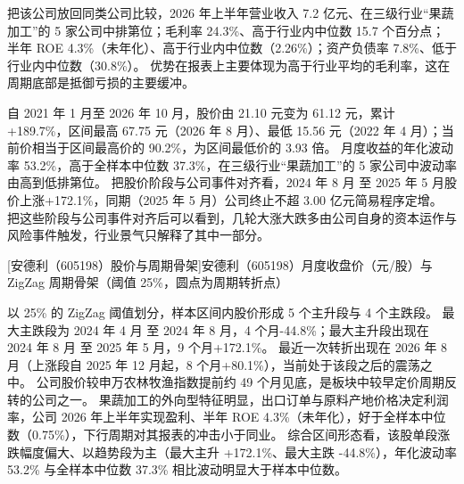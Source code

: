  把该公司放回同类公司比较，2026 年上半年营业收入 7.2 亿元、在三级行业“果蔬加工”的 5 家公司中排第位；毛利率 24.3\%、高于行业内中位数 15.7 个百分点；半年 ROE 4.3\%（未年化）、高于行业内中位数（2.26\%）；资产负债率 7.8\%、低于行业内中位数（30.8\%）。 优势在报表上主要体现为高于行业平均的毛利率，这在周期底部是抵御亏损的主要缓冲。

 自 2021 年 1 月至 2026 年 10 月，股价由 21.10 元变为 61.12 元，累计 +189.7\%，区间最高 67.75 元（2026 年 8 月）、最低 15.56 元（2022 年 4 月）；当前价相当于区间最高价的 90.2\%，为区间最低价的 3.93 倍。 月度收益的年化波动率 53.2\%，高于全样本中位数 37.3\%，在三级行业“果蔬加工”的 5 家公司中波动率由高到低排第位。 把股价阶段与公司事件对齐看，2024 年 8 月 至 2025 年 5 月股价上涨+172.1\%，同期（2025 年 5 月）公司终止不超 3.00 亿元简易程序定增。 把这些阶段与公司事件对齐后可以看到，几轮大涨大跌多由公司自身的资本运作与风险事件触发，行业景气只解释了其中一部分。

\begin{center}
\begin{minipage}{\textwidth}\centering
{}

[安德利（605198）股价与周期骨架]{安德利（605198）月度收盘价（元/股）与 ZigZag 周期骨架（阈值 25\%，圆点为周期转折点）}
\end{minipage}
\end{center}

 以 25\% 的 ZigZag 阈值划分，样本区间内股价形成 5 个主升段与 4 个主跌段。 最大主跌段为 2024 年 4 月 至 2024 年 8 月，4 个月-44.8\%；最大主升段出现在 2024 年 8 月 至 2025 年 5 月，9 个月+172.1\%。 最近一次转折出现在 2026 年 8 月（上涨段自 2025 年 12 月起，8 个月+80.1\%），当前处于该段之后的震荡之中。 公司股价较申万农林牧渔指数提前约 49 个月见底，是板块中较早定价周期反转的公司之一。 果蔬加工的外向型特征明显，出口订单与原料产地价格决定利润率，公司 2026 年上半年实现盈利、半年 ROE 4.3\%（未年化），好于全样本中位数（0.75\%），下行周期对其报表的冲击小于同业。 综合区间形态看，该股单段涨跌幅度偏大、以趋势段为主（最大主升 +172.1\%、最大主跌 -44.8\%），年化波动率 53.2\% 与全样本中位数 37.3\% 相比波动明显大于样本中位数。

